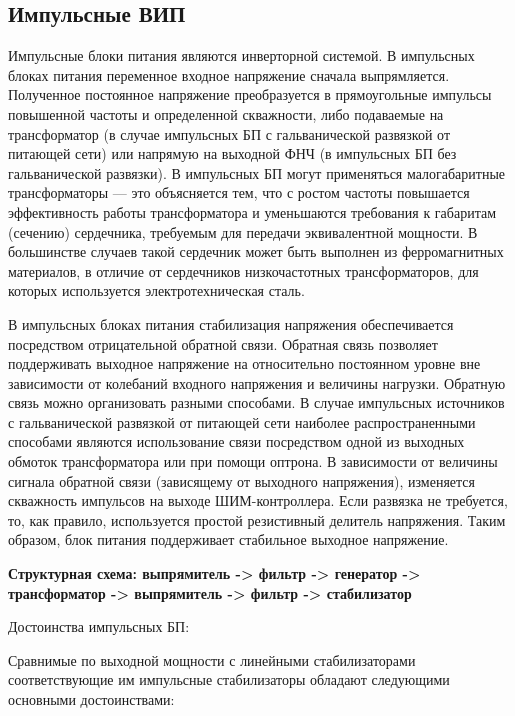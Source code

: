 \subsection*{Импульсные ВИП}

Импульсные блоки питания являются инверторной системой. В импульсных блоках питания переменное входное напряжение сначала выпрямляется. Полученное постоянное напряжение преобразуется в прямоугольные импульсы повышенной частоты и определенной скважности, либо подаваемые на трансформатор (в случае импульсных БП с гальванической развязкой от питающей сети) или напрямую на выходной ФНЧ (в импульсных БП без гальванической развязки). В импульсных БП могут применяться малогабаритные трансформаторы --- это объясняется тем, что с ростом частоты повышается эффективность работы трансформатора и уменьшаются требования к габаритам (сечению) сердечника, требуемым для передачи эквивалентной мощности. В большинстве случаев такой сердечник может быть выполнен из ферромагнитных материалов, в отличие от сердечников низкочастотных трансформаторов, для которых используется электротехническая сталь.

В импульсных блоках питания стабилизация напряжения обеспечивается посредством отрицательной обратной связи. Обратная связь позволяет поддерживать выходное напряжение на относительно постоянном уровне вне зависимости от колебаний входного напряжения и величины нагрузки. Обратную связь можно организовать разными способами. В случае импульсных источников с гальванической развязкой от питающей сети наиболее распространенными способами являются использование связи посредством одной из выходных обмоток трансформатора или при помощи оптрона. В зависимости от величины сигнала обратной связи (зависящему от выходного напряжения), изменяется скважность импульсов на выходе ШИМ-контроллера. Если развязка не требуется, то, как правило, используется простой резистивный делитель напряжения. Таким образом, блок питания поддерживает стабильное выходное напряжение.

\textbf{Структурная схема: выпрямитель -> фильтр -> генератор -> трансформатор -> выпрямитель -> фильтр -> стабилизатор}

Достоинства импульсных БП:

Сравнимые по выходной мощности с линейными стабилизаторами соответствующие им импульсные стабилизаторы обладают следующими основными достоинствами:

